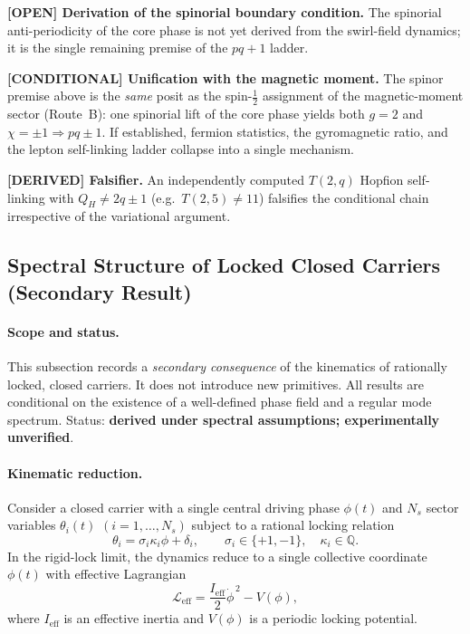 \documentclass[11pt]{article}
\theoremstyle{definition}
\theoremstyle{plain}
\theoremstyle{remark}
\begin{document}
        \textbf{[OPEN] Derivation of the spinorial boundary condition.}
        The spinorial anti-periodicity of the core phase is not yet derived from the swirl-field
        dynamics; it is the single remaining premise of the $pq+1$ ladder.

        \textbf{[CONDITIONAL] Unification with the magnetic moment.}
        The spinor premise above is the \emph{same} posit as the spin-$\tfrac12$ assignment of
        the magnetic-moment sector (Route~B): one spinorial lift of the core phase yields both
        $g=2$ and $\chi=\pm1\Rightarrow pq\pm1$. If established, fermion statistics, the
        gyromagnetic ratio, and the lepton self-linking ladder collapse into a single mechanism.

        \textbf{[DERIVED] Falsifier.}
        An independently computed $T(2,q)$ Hopfion self-linking with $Q_H\neq 2q\pm1$ (e.g.\
        $T(2,5)\neq 11$) falsifies the conditional chain irrespective of the variational
        argument.


\subsection{Spectral Structure of Locked Closed Carriers (Secondary Result)}
    \label{subsec:spectral_locked_carriers}
    
    \paragraph{Scope and status.}
        This subsection records a \emph{secondary consequence} of the kinematics of rationally locked, closed carriers. It does not introduce new primitives. All results are conditional on the existence of a well-defined phase field and a regular mode spectrum. Status: \textbf{derived under spectral assumptions; experimentally unverified}.

    \paragraph{Kinematic reduction.}
        Consider a closed carrier with a single central driving phase $\phi(t)$ and $N_s$ sector variables $\theta_i(t)$ $(i=1,\dots,N_s)$ subject to a rational locking relation
        \begin{equation}
            \theta_i = \sigma_i \kappa_i \phi + \delta_i,
            \qquad
            \sigma_i \in \{+1,-1\},\quad \kappa_i \in \mathbb{Q}.
            \label{eq:locking_relation}
        \end{equation}
        In the rigid-lock limit, the dynamics reduce to a single collective coordinate $\phi(t)$ with effective Lagrangian
        \begin{equation}
            \mathcal{L}_{\mathrm{eff}}
            =
            \frac{I_{\mathrm{eff}}}{2}\dot{\phi}^{\,2}
            -
            V(\phi),
            \label{eq:Leff_canonical}
        \end{equation}
        where $I_{\mathrm{eff}}$ is an effective inertia and $V(\phi)$ is a periodic locking potential.
\end{document}
